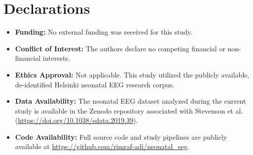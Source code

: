 \documentclass[10pt,twocolumn,letterpaper]{article}
\begin{document}
\section*{Declarations}

\begin{itemize}
    \item \textbf{Funding:} No external funding was received for this study.
    \item \textbf{Conflict of Interest:} The authors declare no competing financial or non-financial interests.
    \item \textbf{Ethics Approval:} Not applicable. This study utilized the publicly available, de-identified Helsinki neonatal EEG research corpus.
    \item \textbf{Data Availability:} The neonatal EEG dataset analyzed during the current study is available in the Zenodo repository associated with Stevenson et al.~\cite{stevenson2019} (\url{https://doi.org/10.1038/sdata.2019.39}).
    \item \textbf{Code Availability:} Full source code and study pipelines are publicly available at \url{https://github.com/rimraf-adi/neonatal_eeg}.
\end{itemize}



\end{document}
